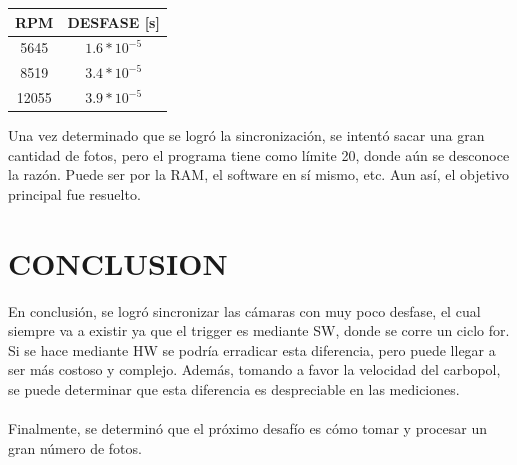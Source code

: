 \documentclass{article}
\begin{document}
\begin{center}
    \begin{tabular}{|c|c|}
    \hline
    RPM & DESFASE [s] \\
    \hline
    5645 & $1.6*10^{-5}$ \\
    \hline
    8519 & $3.4*10^{-5}$ \\
    \hline
    12055 & $3.9*10^{-5}$ \\
    \hline
    \end{tabular}
\end{center}

\noindent Una vez determinado que se logró la sincronización, se intentó sacar una gran cantidad de fotos, pero el programa tiene como límite 20, donde aún se desconoce la razón. Puede ser por la RAM, el software en sí mismo, etc. Aun así, el objetivo principal fue resuelto.

\section{CONCLUSION}
\noindent En conclusión, se logró sincronizar las cámaras con muy poco desfase, el cual siempre va a existir ya que el trigger es mediante SW, donde se corre un ciclo for. Si se hace mediante HW se podría erradicar esta diferencia, pero puede llegar a ser más costoso y complejo. Además, tomando a favor la velocidad del carbopol, se puede determinar que esta diferencia es despreciable en las mediciones.
\\ \\
Finalmente, se determinó que el próximo desafío es cómo tomar y procesar un gran número de fotos.
\end{document}
